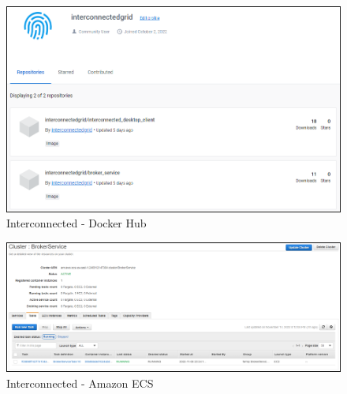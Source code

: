 \begin{figure}[!ht]
    \centering
    \includegraphics[width=\linewidth]{document/chapters/chapter_7/images/interconnected_dockerhub.png}
    \caption{Interconnected - Docker Hub}
    \label{fig:interconnected_dockerhub}
\end{figure}

\begin{figure}[!ht]
    \centering
    \includegraphics[width=\linewidth]{document/chapters/chapter_7/images/interconnected_ecs.png}
    \caption{Interconnected - Amazon ECS}
    \label{fig:interconnected_ecs}
\end{figure}